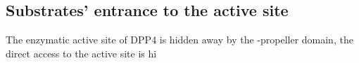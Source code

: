 \subsection{Substrates' entrance to the active site}

The enzymatic active site of DPP4 is hidden away by the \beta-propeller domain, the direct access to the active site is hi